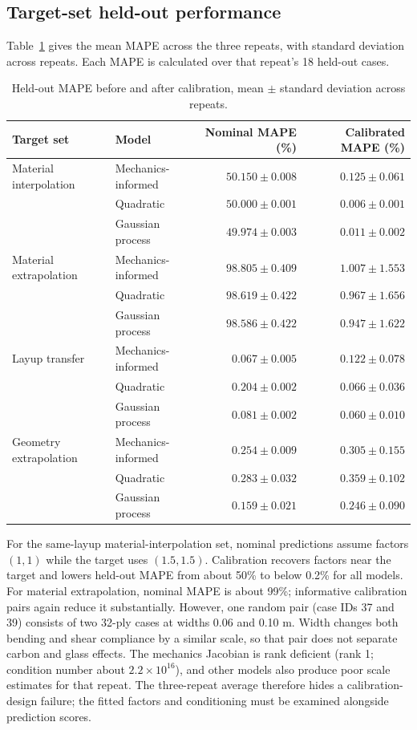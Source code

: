 \documentclass[11pt]{article}
\begin{document}
\subsection{Target-set held-out performance}
Table~\ref{tab:targetmetrics} gives the mean MAPE across the three repeats, with standard deviation across repeats. Each MAPE is calculated over that repeat's 18 held-out cases.
\begin{table}[ht]
\centering
\small
\caption{Held-out MAPE before and after calibration, mean $\pm$ standard deviation across repeats.}
\label{tab:targetmetrics}
\begin{tabular}{llrr}
\toprule
Target set & Model & Nominal MAPE (\%) & Calibrated MAPE (\%) \\
\midrule
Material interpolation & Mechanics-informed & $50.150\pm0.008$ & $0.125\pm0.061$ \\
 & Quadratic & $50.000\pm0.001$ & $0.006\pm0.001$ \\
 & Gaussian process & $49.974\pm0.003$ & $0.011\pm0.002$ \\
\addlinespace
Material extrapolation & Mechanics-informed & $98.805\pm0.409$ & $1.007\pm1.553$ \\
 & Quadratic & $98.619\pm0.422$ & $0.967\pm1.656$ \\
 & Gaussian process & $98.586\pm0.422$ & $0.947\pm1.622$ \\
\addlinespace
Layup transfer & Mechanics-informed & $0.067\pm0.005$ & $0.122\pm0.078$ \\
 & Quadratic & $0.204\pm0.002$ & $0.066\pm0.036$ \\
 & Gaussian process & $0.081\pm0.002$ & $0.060\pm0.010$ \\
\addlinespace
Geometry extrapolation & Mechanics-informed & $0.254\pm0.009$ & $0.305\pm0.155$ \\
 & Quadratic & $0.283\pm0.032$ & $0.359\pm0.102$ \\
 & Gaussian process & $0.159\pm0.021$ & $0.246\pm0.090$ \\
\bottomrule
\end{tabular}
\end{table}

For the same-layup material-interpolation set, nominal predictions assume factors $(1,1)$ while the target uses $(1.5,1.5)$. Calibration recovers factors near the target and lowers held-out MAPE from about 50\% to below 0.2\% for all models. For material extrapolation, nominal MAPE is about 99\%; informative calibration pairs again reduce it substantially. However, one random pair (case IDs 37 and 39) consists of two 32-ply cases at widths 0.06 and 0.10 m. Width changes both bending and shear compliance by a similar scale, so that pair does not separate carbon and glass effects. The mechanics Jacobian is rank deficient (rank 1; condition number about $2.2\times10^{16}$), and other models also produce poor scale estimates for that repeat. The three-repeat average therefore hides a calibration-design failure; the fitted factors and conditioning must be examined alongside prediction scores.
\end{document}
